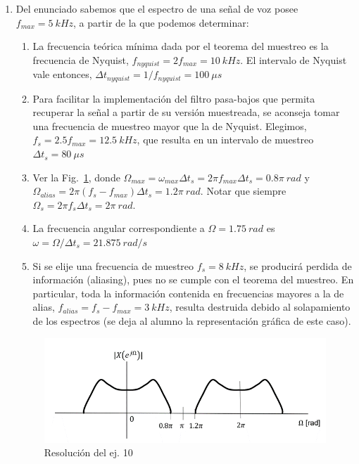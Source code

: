 \documentclass[10pt,a4paper]{article}
\begin{document}
\begin{enumerate}
\item Del enunciado sabemos que el espectro de una señal de voz posee $f_{max}=5~kHz$, a partir de la que 
podemos determinar:
\begin{enumerate}
	\item La frecuencia teórica mínima dada por el teorema del muestreo es la frecuencia de Nyquist, 
	$f_{nyquist}=2f_{max}=10 ~kHz$. El intervalo de Nyquist vale entonces,  
	$\Delta t_{nyquist}=1/f_{nyquist}=100~\mu s$
	\item Para facilitar la implementación del filtro pasa-bajos que permita recuperar la señal a partir de su versión 
	muestreada, se aconseja tomar una frecuencia de muestreo mayor que la de Nyquist. Elegimos,  
	$f_{s}=2.5f_{max}=12.5~kHz$, que resulta en un intervalo de muestreo $\Delta t_s=80~\mu s$
	\item  Ver la Fig.~\ref{fig:ej_10}, donde $\Omega_{max}=\omega_{max}\Delta t_s=2\pi f_{max}\Delta t_s=0.8\pi~rad$ 
	y 
	$\Omega_{alias}=2\pi (f_{s}-f_{max})\Delta t_s=1.2\pi~rad$. Notar que siempre $\Omega_{s}=2\pi f_{s}\Delta 
	t_s=2\pi~rad$.
	\item La frecuencia angular correspondiente a $\Omega=1.75~rad$ es $\omega=\Omega/\Delta t_s= 21.875~rad/s$
	\item Si se elije una frecuencia de muestreo $f_s=8~kHz$, se producirá perdida de información (aliasing), pues no 
	se cumple con el teorema del muestreo. En particular, toda la información contenida en frecuencias mayores a la de  
	alias, $f_{alias}=f_s-f_{max}=3~kHz$, resulta destruida debido al solapamiento de los espectros (se deja al alumno 
	la representación gráfica de este caso). 
\end{enumerate} 

\begin{figure}[h]
	\begin{center}
		\includegraphics[width=14cm]{tp8_ej10.png}
	\end{center}
	\caption{Resolución del ej. 10}
	\label{fig:ej_10}
\end{figure}



\end{enumerate}
\end{document}
